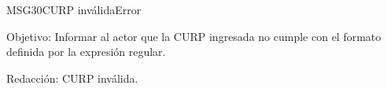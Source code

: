 \begin{mensaje}{MSG30}{CURP inválida}{Error}
	\item [Objetivo:] Informar al actor que la CURP ingresada no cumple con el formato definida por la expresión regular.
	\item[Redacción:] CURP inválida.
\end{mensaje}